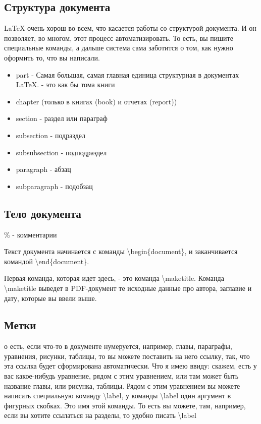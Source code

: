 \documentclass[a4paper,12pt]{article} %
\begin{document}
\subsection{Структура документа}
LaTeX очень хорош во всем, что касается работы со
структурой документа. И он позволяет, во многом, этот процесс
автоматизировать. То есть, вы пишите специальные команды, а
дальше система сама заботится о том, как нужно оформить то,
что вы написали.
\begin{itemize}
	\item part - Самая большая, самая главная
	единица структурная в документах LaTeX. - это как бы тома книги
	\item chapter (только в книгах (book) и отчетах (report))
	\item section - раздел 	или параграф
	\item subsection - подраздел
	\item subsubsection - подподраздел
	\item paragraph - абзац
	\item subparagraph - подобзац
	
\end{itemize}
\subsection{Тело документа}
\% - комментарии 

Текст документа начинается с
команды  \textbackslash begin\{document\}, и заканчивается командой
 \textbackslash end\{document\}.
 
 Первая команда, которая идет здесь, - это
 команда \textbackslash maketitle. Команда \textbackslash maketitle выведет в
 PDF-документ те исходные данные про автора, заглавие и дату,
 которые вы ввели выше.
 
\subsection{Метки}
 о есть, если что-то в документе нумеруется, например, главы, параграфы,
 уравнения, рисунки, таблицы, то вы можете поставить на него ссылку, так, что эта ссылка будет сформирована
 автоматически. Что я имею ввиду: скажем, есть у вас
 какое-нибудь уравнение, рядом с этим уравнением, или там может быть
 название главы, или рисунка, таблицы. Рядом с этим уравнением вы можете
 написать специальную команду \textbackslash label, у команды \textbackslash label один аргумент в
 фигурных скобках. Это имя этой команды. То есть вы можете, там,
 например, если вы хотите ссылаться на разделы, то
 удобно писать \textbackslash label	
 
\end{document}
